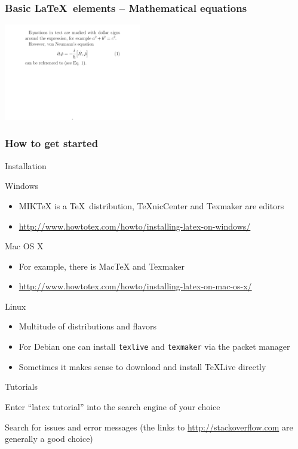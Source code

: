 \documentclass{tum-presentation}
\begin{document}
\begin{frame}
  \frametitle{Basic \LaTeX~elements -- Mathematical equations}

  \vspace{0.5cm}

  \begin{multicols}{2}
    

    \columnbreak

    \includegraphics[width=0.45\textwidth, frame]{figures/equations}
  \end{multicols}
\end{frame}

\begin{frame}
\frametitle{How to get started}

Installation
\begin{PraesentationAufzaehlung}
\item Windows
  \begin{itemize}
  \item MIKTeX is a \TeX~distribution, TeXnicCenter and Texmaker are editors
  \item \url{http://www.howtotex.com/howto/installing-latex-on-windows/}
  \end{itemize}
\item Mac OS X
  \begin{itemize}
  \item For example, there is MacTeX and Texmaker
  \item \url{http://www.howtotex.com/howto/installing-latex-on-mac-os-x/}
  \end{itemize}
\item Linux
  \begin{itemize}
    \item Multitude of distributions and flavors
    \item For Debian one can install \texttt{texlive} and \texttt{texmaker} via the packet manager
    \item Sometimes it makes sense to download and install TeXLive directly
  \end{itemize}
\end{PraesentationAufzaehlung}
Tutorials
\begin{PraesentationAufzaehlung}
\item Enter ``latex tutorial'' into the search engine of your choice
\item Search for issues and error messages (the links to \url{http://stackoverflow.com} are generally a good choice)
\end{PraesentationAufzaehlung}
\end{frame}
\end{document}
